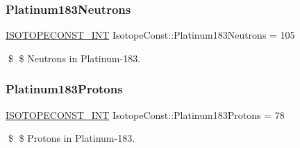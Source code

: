 \subsubsection{\texorpdfstring{Platinum183\+Neutrons}{Platinum183Neutrons}}
{\footnotesize\ttfamily \mbox{\hyperlink{group___isotope_const-_macros_ga5f18360b3e99483a35c32d789e62621c}{I\+S\+O\+T\+O\+P\+E\+C\+O\+N\+S\+T\+\_\+\+I\+NT}} Isotope\+Const\+::\+Platinum183\+Neutrons = 105}

\$ \$ Neutrons in Platinum-\/183. \mbox{\label{group___isotope_const-_platinum-_pt183_ga078b017ec976ab659c9164f8a4615d68}} 
\subsubsection{\texorpdfstring{Platinum183\+Protons}{Platinum183Protons}}
{\footnotesize\ttfamily \mbox{\hyperlink{group___isotope_const-_macros_ga5f18360b3e99483a35c32d789e62621c}{I\+S\+O\+T\+O\+P\+E\+C\+O\+N\+S\+T\+\_\+\+I\+NT}} Isotope\+Const\+::\+Platinum183\+Protons = 78}

\$ \$ Protons in Platinum-\/183. 